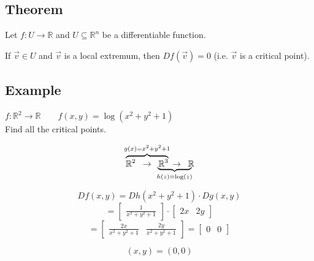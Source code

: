 \documentclass{article}
\begin{document}
\subsection*{Theorem}
Let $f: U\rightarrow\mathbb{R}$ and $U\subseteq\mathbb{R}^n$ be a differentiable function.

If $\vec{v}\in U$ and $\vec{v}$ is a local extremum, then $Df(\vec{v})=0$ (i.e. $\vec{v}$ is a critical point).


\subsection*{Example}

$f:\mathbb{R}^2\rightarrow\mathbb{R}\qquad f(x,y)=\log(x^2+y^2+1)$\\[6pt]
Find all the critical points.

\[
\ooalign{
  $\overbrace{\mathbb{R}^2\;\;\rightarrow\;\;\mathbb{R}^3}^{g(x)=x^2+y^2+1}\rightarrow\;\;\mathbb{R}$\cr
  $\phantom{\mathbb{R}^2\;\;\rightarrow\;\;{}} {\underbrace{\phantom{\mathbb{R}^3\rightarrow\;\;\mathbb{R}}}_{h(z)=\log(z)}} $\cr
}
\]

\[Df(x,y)=Dh(x^2+y^2+1)\cdot Dg(x,y)\]
\[=\begin{bmatrix}
    \frac{1}{x^2+y^2+1}
\end{bmatrix}\cdot\begin{bmatrix}
    2x&2y
\end{bmatrix}\]
\[=\begin{bmatrix}
    \frac{2x}{x^2+y^2+1}&\frac{2y}{x^2+y^2+1}
\end{bmatrix}=\begin{bmatrix}
    0&0
\end{bmatrix}\]

\[(x,y)=(0,0)\]
\end{document}
